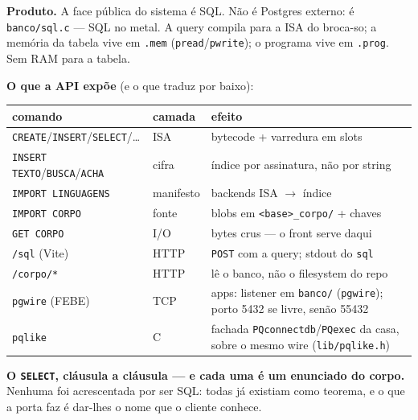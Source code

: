 \documentclass[11pt,a4paper]{article}
\newcommand{\code}[1]{\texttt{\small #1}}
\begin{document}
\noindent\textbf{Produto.} A face pública do sistema é SQL. Não é Postgres
externo: é \code{banco/sql.c} --- SQL no metal. A query compila para a ISA
do broca-so; a memória da tabela vive em \code{.mem} (\code{pread}/\code{pwrite});
o programa vive em \code{.prog}. Sem RAM para a tabela.

\medskip\noindent\textbf{O que a API expõe} (e o que traduz por baixo):
\begin{center}\small
\begin{tabular}{@{}llp{}@{}}
\toprule
comando & camada & efeito \\
\midrule
\code{CREATE}/\code{INSERT}/\code{SELECT}/\ldots & ISA & bytecode + varredura em slots \\
\code{INSERT TEXTO}/\code{BUSCA}/\code{ACHA} & cifra & índice por assinatura, não por string \\
\code{IMPORT LINGUAGENS} & manifesto & backends ISA $\to$ índice \\
\code{IMPORT CORPO} & fonte & blobs em \code{<base>\_corpo/} + chaves \\
\code{GET CORPO} & I/O & bytes crus --- o front serve daqui \\
\code{/sql} (Vite) & HTTP & \code{POST} com a query; stdout do \code{sql} \\
\code{/corpo/*} & HTTP & lê o banco, não o filesystem do repo \\
\code{pgwire} (FEBE) & TCP & apps: listener em \code{banco/} (\code{pgwire}); porto 5432 se livre, senão 55432 \\
\code{pqlike} & C & fachada \code{PQconnectdb}/\code{PQexec} da casa, sobre o mesmo wire (\code{lib/pqlike.h}) \\
\bottomrule
\end{tabular}
\end{center}

\medskip\noindent\textbf{O \code{SELECT}, cláusula a cláusula --- e cada uma é um
enunciado do corpo.} Nenhuma foi acrescentada por ser SQL: todas já existiam
como teorema, e o que a porta faz é dar-lhes o nome que o cliente conhece.
\end{document}
